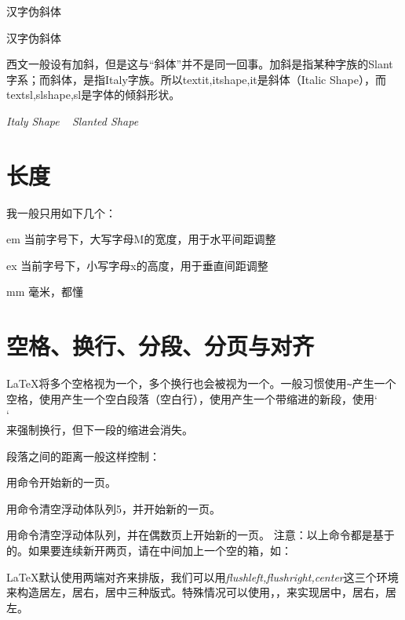 \begin{center}
    {汉字伪斜体}
\end{center}

\begin{latex}
{汉字伪斜体}
\end{latex}

西文一般设有加斜，但是这与“斜体”并不是同一回事。加斜是指某种字族的Slant字系；而斜体，是指Italy字族。所以textit,itshape,it是斜体（Italic Shape），而textsl,slshape,sl是字体的倾斜形状。

\begin{center}
{ \textit{Italy Shape} ~ \textsl{Slanted Shape}}
\end{center}

\section{长度}

我一般只用如下几个：

\begin{asparadesc}
    \item[em] 当前字号下，大写字母M的宽度，用于水平间距调整
    \item[ex] 当前字号下，小写字母x的高度，用于垂直间距调整
    \item[mm] 毫米，都懂
\end{asparadesc}



\section{空格、换行、分段、分页与对齐}

\LaTeX 将多个空格视为一个，多个换行也会被视为一个。一般习惯使用\verb|~|产生一个空格，使用产生一个空白段落（空白行），使用产生一个带缩进的新段，使用\char`\\ \char`\\来强制换行，但下一段的缩进会消失。

段落之间的距离一般这样控制：

\begin{latex}
\setlength{\parskip}{0pt plus 1pt}%
\end{latex}

用命令开始新的一页。

用命令清空浮动体队列5，并开始新的一页。

用命令清空浮动体队列，并在偶数页上开始新的一页。
注意：以上命令都是基于的。如果要连续新开两页，请在中间加上一个空的箱，如：

\begin{latex}
\newpage\mbox{}\newpage
\end{latex}

\LaTeX 默认使用两端对齐来排版，我们可以用\emph{flushleft,flushright,center}这三个环境来构造居左，居右，居中三种版式。特殊情况可以使用，，来实现居中，居右，居左。







